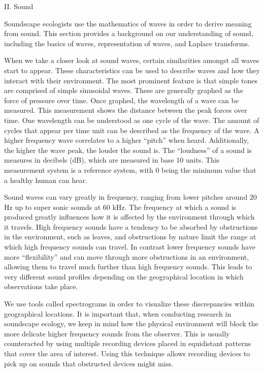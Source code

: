 \begin{center}
II. Sound
\end{center}
\begin{flushleft}
\setlength{\parindent}{0.125in}
Soundscape ecologists use the mathematics of waves in order to derive meaning from sound. This section provides a background on our understanding of sound, including the basics of waves, representation of waves, and Laplace transforms.\par

When we take a closer look at sound waves, certain similarities amongst all waves start to appear. These characteristics can be used to describe waves and how they interact with their environment. The most prominent feature is that simple tones are comprised of simple sinusoidal waves. These are generally graphed as the force of pressure over time. Once graphed, the wavelength of a wave can be measured. This measurement shows the distance between the peak forces over time. One wavelength can be understood as one cycle of the wave. The amount of cycles that appear per time unit can be described as the frequency of the wave. A higher frequency wave correlates to a higher ``pitch'' when heard. Additionally, the higher the wave peak, the louder the sound is. The ``loudness'' of a sound is measures in decibels (dB), which are measured in base 10 units. This measurement system is a reference system, with 0 being the minimum value that a healthy human can hear.\cite{villanueva}\par

Sound waves can vary greatly in frequency, ranging from lower pitches around 20 Hz up to super sonic sounds at 60 kHz. The frequency at which a sound is produced greatly influences how it is affected by the environment through which it travels. High frequency sounds have a tendency to be absorbed by obstructions in the environment, such as leaves, and obstructions by nature limit the range at which high frequency sounds can travel. In contrast lower frequency sounds have more ``flexibility'' and can move through more obstructions in an environment, allowing them to travel much further than high frequency sounds. This leads to very different sound profiles depending on the geographical location in which observations take place.\par

We use tools called spectrograms in order to visualize these discrepancies within geographical locations. It is important that, when conducting research in soundscape ecology, we keep in mind how the physical environment will block the more delicate higher frequency sounds from the observer. This is usually counteracted by using multiple recording devices placed in equidistant patterns that cover the area of interest. Using this technique allows recording devices to pick up on sounds that obstructed devices might miss.\par


\end{flushleft}
